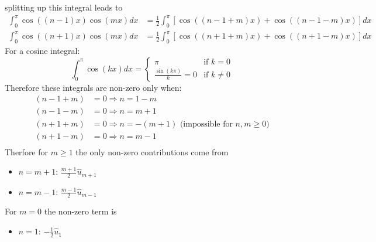 \begin{itemize}
	      splitting up this integral leads to
	      \begin{equation}
		      \begin{aligned}
			      \int_0^{\pi} \cos((n-1)x)\cos(mx)dx & = \frac{1}{2}\int_0^{\pi} [\cos((n-1+m)x) + \cos((n-1-m)x)]dx \\
			      \int_0^{\pi} \cos((n+1)x)\cos(mx)dx & = \frac{1}{2}\int_0^{\pi} [\cos((n+1+m)x) + \cos((n+1-m)x)]dx
		      \end{aligned}
		      \label{eq:int}
	      \end{equation}
	      For a cosine integral:
	      \begin{equation}
		      \int_0^{\pi} \cos(kx)dx = \begin{cases}
			      \pi                      & \text{if } k = 0    \\
			      \frac{\sin(k\pi)}{k} = 0 & \text{if } k \neq 0
		      \end{cases}
		      \label{eq:cos}
	      \end{equation}
	      Therefore these integrals are non-zero only when:
	      \begin{equation}
		      \begin{aligned}
			      (n - 1 + m) & = 0 \Rightarrow n = 1 - m                                        \\
			      (n - 1 - m) & = 0 \Rightarrow n = m + 1                                        \\
			      (n + 1 + m) & = 0 \Rightarrow n = - (m+1) \text{ (impossible for } n,m \geq 0) \\
			      (n + 1 - m) & = 0 \Rightarrow n = m - 1                                        \\
		      \end{aligned}
		      \label{eq:caso}
	      \end{equation}
	      Therfore for $m \geq 1$ the only non-zero contributions come from
	      \begin{itemize}
		      \item $n=m+1$: $\frac{m+1}{2}\hat{u}_{m+1}$
		      \item $n=m-1$: $\frac{m-1}{2}\hat{u}_{m-1}$
	      \end{itemize}
	      For $m=0$ the non-zero term is
	      \begin{itemize}
		      \item $n=1$: $-\frac{1}{2}\hat{u}_1$
	      \end{itemize}
\end{itemize}
